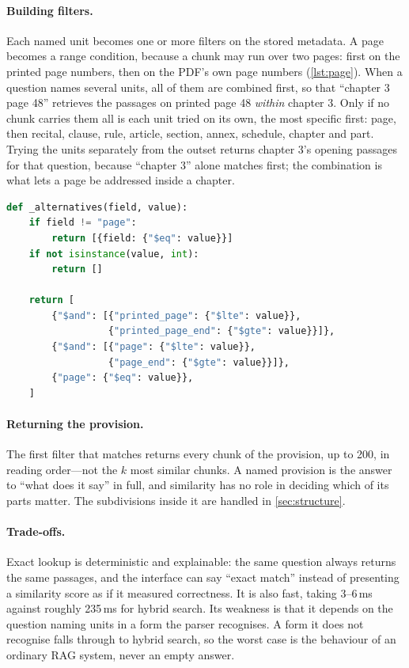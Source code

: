 \paragraph{Building filters.} Each named unit becomes one or more filters on
the stored metadata. A page becomes a range condition, because a chunk may run
over two pages: first on the printed page numbers, then on the PDF's own page
numbers (\cref{lst:page}). When a question names several units, all of them
are combined first, so that ``chapter 3 page 48'' retrieves the passages on
printed page 48 \emph{within} chapter 3. Only if no chunk carries them all is
each unit tried on its own, the most specific first: page, then recital,
clause, rule, article, section, annex, schedule, chapter and part. Trying the
units separately from the outset returns chapter 3's opening passages for that
question, because ``chapter 3'' alone matches first; the combination is what
lets a page be addressed inside a chapter.

\begin{lstlisting}[float, language=Python, caption={Filters for one named unit; a
page matches every chunk that runs over it (\texttt{retrieval/hybrid.py}).},
label={lst:page}]
def _alternatives(field, value):
    if field != "page":
        return [{field: {"$eq": value}}]
    if not isinstance(value, int):
        return []

    return [
        {"$and": [{"printed_page": {"$lte": value}},
                  {"printed_page_end": {"$gte": value}}]},
        {"$and": [{"page": {"$lte": value}},
                  {"page_end": {"$gte": value}}]},
        {"page": {"$eq": value}},
    ]
\end{lstlisting}

\paragraph{Returning the provision.} The first filter that matches returns
every chunk of the provision, up to 200, in reading order---not the
$k$ most similar chunks. A named provision is the answer to ``what does it
say'' in full, and similarity has no role in deciding which of its parts
matter. The subdivisions inside it are handled in \cref{sec:structure}.

\paragraph{Trade-offs.} Exact lookup is deterministic and explainable: the
same question always returns the same passages, and the interface can say
``exact match'' instead of presenting a similarity score as if it measured
correctness. It is also fast, taking 3--6\,ms against roughly 235\,ms for
hybrid search. Its weakness is that it depends on the question naming units in
a form the parser recognises. A form it does not recognise falls through to
hybrid search, so the worst case is the behaviour of an ordinary RAG system,
never an empty answer.

